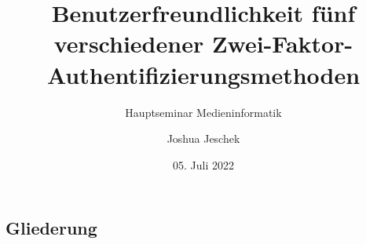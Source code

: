 \usepackage[T1]{fontenc}
\usepackage[utf8]{inputenc}
\usepackage[ngerman]{babel}
\usepackage{tikz} %
\usepackage{enotez} %
\usepackage[nobiblatex]{xurl} %
\usepackage{pgfplotstable} %

\usepackage{nameref}
\makeatletter
\newcommand*{\currentsectionname}{\@currentlabelname}
\makeatother



\graphicspath{ {./images/} }

\nocite{*}


\newcommand{\Title}{Benutzerfreundlichkeit fünf verschiedener Zwei-Faktor-Authentifizierungsmethoden}
\newcommand{\ShortTitle}{Zwei-Faktor-Authentifizierungsmethoden}
\title[\ShortTitle]{\Title}
\subtitle{Hauptseminar Medieninformatik}
\author{Joshua Jeschek}
\date{05. Juli 2022}



\tucthreeheadlines{}
\begin{frame}
    \titlepage{}


\end{frame}

\tuctwoheadlines{}


\subsection*{Gliederung}
\begin{frame}
    \frametitle{\currentsectionname}
    \tableofcontents


\end{frame}

